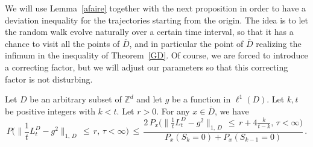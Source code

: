 \documentclass[10pt]{amsart}
\theoremstyle{definition}\newtheorem{defi}[theo]{Definition}\newtheorem{rema}[theo]{Remark}\newtheorem{exam}[theo]{Example}\newtheorem{exem}[theo]{Example}\newtheorem{nota}[theo]{Notation}
\newcommand*\bD{\overline{D}}
\newcommand*\Zd {{\mathbb Z^d}}
\begin{document}
We will use Lemma~\ref{afaire} together with the next proposition in order to have a deviation inequality for the trajectories starting from the origin. The idea is to let the random walk evolve naturally over a certain time interval, so that it has a chance to visit all the points of $\bD$, and in particular the point of $\bD$ realizing the infimum in the inequality of Theorem~\ref{GD}. Of course, we are forced to introduce a correcting factor, but we will adjust our parameters so that this correcting factor is not disturbing.
\begin{prop}\label{depe}
Let $D$ be an arbitrary subset of $\Zd$ and let $g$ be a function in $\ell^{1}(D)$. Let $k,t$ be positive integers with $k<t$. Let $r>0$. For any $x\in\bD$, we have
\begin{equation*}
P\Big(
\Big\|\frac{1}{t}L_t^D-g^2
\Big\|_{1,\,D}\,\leq\,r,\,\tau<\infty
\Big)\,\leq\,
\frac{\displaystyle 2\, P_x\Big(
\Big\|\frac{1}{t}L_t^D-g^2
\Big\|_{1,\,D}\,\leq\,r +4\frac{k}{t-k},\,\tau<\infty
\Big)} {\displaystyle P_x(S_{k}=0)+ P_x(S_{k-1}=0)}\,.
\end{equation*}
\end{prop}
\end{document}
